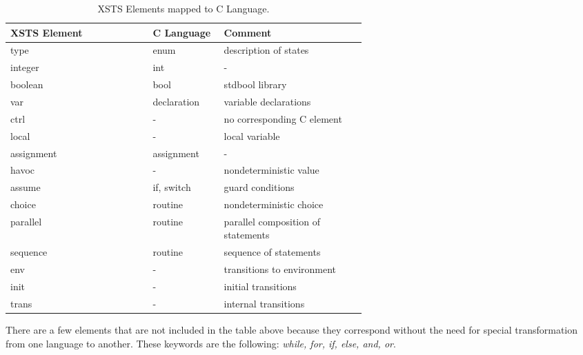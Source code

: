 \begin{table}[h]
	\centering
	\begin{tabular}{p{0.20\linewidth\centering}|p{0.20\linewidth}|p{0.40\linewidth}}
		\textbf{XSTS Element} & \textbf{C Language} & \textbf{Comment} \\
		\hline
		type & enum & description of states \\
		integer & int & - \\
		boolean & bool & stdbool library \\
		\hline
		var & declaration & variable declarations \\
		ctrl & - & no corresponding C element \\
		local & - & local variable \\
		assignment & assignment & - \\
		havoc & - & nondeterministic value \\
		assume & if, switch & guard conditions \\
		\hline
		choice & routine & nondeterministic choice \\
		parallel & routine & parallel composition of statements \\
		sequence & routine & sequence of statements \\
		\hline
		env & - & transitions to environment \\
		init & - & initial transitions \\
		trans & - & internal transitions \\
		\hline
	\end{tabular}
	\caption{XSTS Elements mapped to C Language.}
	\label{table-label}
\end{table}

There are a few elements that are not included in the table above because they correspond without the need for special transformation from one language to another. These keywords are the following: \textit{while, for, if, else, and, or}.

